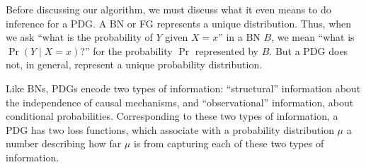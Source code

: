 \documentclass[twoside]{article}
\newcommand\discard[1]{}
\begin{document}
{
Before discussing our algorithm, we must discuss what it even means to do inference for a PDG.  
A BN or FG represents a unique distribution. 
Thus, when we ask ``what is the probability of $Y$ given $X{=}x$''
in a BN $B$, we mean ``what is $\Pr(Y \mid X{=}x)$?'' for the probability $\Pr$ represented by $B$.
But a PDG does not, in general, represent a unique probability distribution.

Like BNs, PDGs encode two types of information: ``structural''
information about the independence of causal mechanisms,
and ``observational'' information,
about conditional probabilities.
Corresponding to these two types of information,
a PDG has two loss functions,
which associate with a
probability distribution $\mu$
a number describing
how far $\mu$ is from capturing each of
these two types of information.
\discard
{
    Given a weight $\gamma \in [0,\infty)$,
    we take the \emph{$\gamma$-semantics} of a PDG to be the
    set of distributions that minimize the observational loss function
    plus $\gamma$ times the structural loss function plus.
    We can also consider the \emph{$*$-semantics}, which, roughly speaking,
    is the limit of $ \gamma$-semantics as $\gamma$ goes to 0 (so amounts to focusing on
    the observational loss, using the structural loss only to break
    ties).  This gives us a family of inference notions, parameterized
    by $\gamma$ (or $*$), depending on how we choose to weight the loss
    function. 
}}
\end{document}
